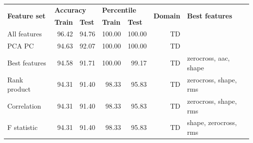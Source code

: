 \begin{table}[h]
\centering
\begin{adjustbox}{width=\textwidth}
\begin{tabular}{|l|rr|rr|r|l|}
\hline
\multirow{2}{*}{\textbf{Feature set}} & \multicolumn{2}{l|}{\textbf{Accuracy}}                                   & \multicolumn{2}{l|}{\textbf{Percentile}}                 & \multicolumn{1}{l|}{\multirow{2}{*}{\textbf{Domain}}} & \multirow{2}{*}{\textbf{Best features}} \\ \cline{2-5}
                                      & \multicolumn{1}{l|}{\textbf{Train}} & \multicolumn{1}{l|}{\textbf{Test}} & \multicolumn{1}{l|}{\textbf{Train}} & \multicolumn{1}{l|}{\textbf{Test}} & \multicolumn{1}{l|}{}                               &                                         \\ \hline
All features                          & \multicolumn{1}{r|}{96.42}          & 94.76                              & \multicolumn{1}{r|}{100.00}         & 100.00                             & TD                                                   &                                         \\ \hline
PCA PC                                & \multicolumn{1}{r|}{94.63}          & 92.07                              & \multicolumn{1}{r|}{100.00}         & 100.00                             & TD                                                   &                                         \\ \hline
Best features                         & \multicolumn{1}{r|}{94.58}          & 91.71                              & \multicolumn{1}{r|}{100.00}         & 99.17                              & TD                                                   & zerocross, aac, shape                   \\ \hline
Rank product                          & \multicolumn{1}{r|}{94.31}          & 91.40                              & \multicolumn{1}{r|}{98.33}          & 95.83                              & TD                                                   & zerocross, shape, rms                   \\ \hline
Correlation                           & \multicolumn{1}{r|}{94.31}          & 91.40                              & \multicolumn{1}{r|}{98.33}          & 95.83                              & TD                                                   & zerocross, shape, rms                   \\ \hline
F statistic                           & \multicolumn{1}{r|}{94.31}          & 91.40                              & \multicolumn{1}{r|}{98.33}          & 95.83                              & TD                                                   & shape, zerocross, rms                   \\ \hline

\end{tabular}
\end{adjustbox}
\end{table}
